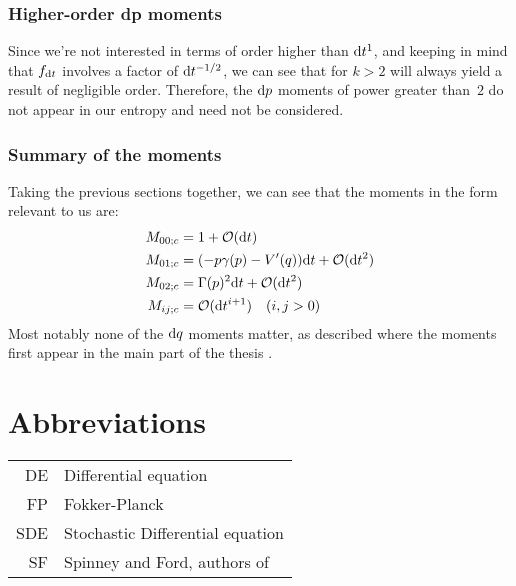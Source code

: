 \subsubsection{Higher-order dp moments}

Since we're not interested in terms of order higher than \(\mathrm{d} t^1\), and keeping in mind that \(f_{\mathrm{d} t}\) involves a factor of \(\mathrm{d} t^{-1/2}\), we can see that for \(k>2\)  will always yield a result of negligible order. Therefore, the \(\mathrm{d} p\) moments of power greater than~\(2\) do not appear in our entropy and need not be considered.

\subsubsection{Summary of the moments}

Taking the previous sections together, we can see that the moments in the form relevant to us are:
%
\begin{align}
	M_{00;c} &= 1 + \mathcal{O}(\mathrm{d} t) \\
	M_{01;c} &= (-p\gamma(p) - V'(q)) \mathrm{d} t + \mathcal{O}(\mathrm{d} t^2) \\
	M_{02;c} &= \Gamma(p)^2 \mathrm{d} t + \mathcal{O}(\mathrm{d} t^2) \\
	M_{ij;c} &= \mathcal{O}(\mathrm{d} t^{i+1}) \quad (i,j > 0)
\end{align}
%
Most notably none of the \(\mathrm{d} q\) moments matter, as described where the moments first appear in the main part of the thesis .


\section{Abbreviations}


\begin{tabular}{r l}
	DE & Differential equation \\
	FP & Fokker-Planck \\
	SDE & Stochastic Differential equation \\
	SF & Spinney and Ford, authors of \cite{sf}
\end{tabular}


